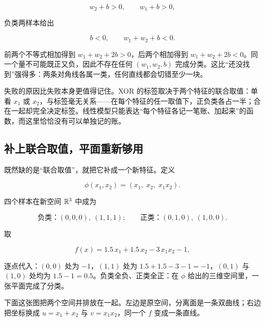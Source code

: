 \[
w_2+b>0,\qquad w_1+b>0,
\]

负类两样本给出

\[
b<0,\qquad w_1+w_2+b<0.
\]

前两个不等式相加得到 \(w_1+w_2+2b>0\)，后两个相加得到 \(w_1+w_2+2b<0\)。同一个量不可能既正又负，因此不存在任何 \((w_1,w_2,b)\) 完成分类。这比``还没找到''强得多：两条对角线各属一类，任何直线都会切错至少一块。

失败的原因比失败本身更值得记住。XOR 的标签取决于两个特征的联合取值：单看 \(x_1\) 或 \(x_2\)，与标签毫无关系——在每个特征的任一取值下，正负类各占一半；合在一起却完全决定标签。线性模型只能表达``每个特征各记一笔账、加起来''的函数，而这里恰恰没有可以单独记的账。

\subsection{补上联合取值，平面重新够用}

既然缺的是``联合取值''，就把它补成一个新特征。定义

\[
\phi(x_1,x_2)=(x_1,\;x_2,\;x_1x_2).
\]

四个样本在新空间 \(\mathbb{R}^3\) 中成为

\[
\text{负类：}(0,0,0),\ (1,1,1);
\qquad
\text{正类：}(0,1,0),\ (1,0,0).
\]

取

\[
f(x)=1.5\,x_1+1.5\,x_2-3\,x_1x_2-1,
\]

逐点代入：\((0,0)\) 处为 \(-1\)，\((1,1)\) 处为 \(1.5+1.5-3-1=-1\)，\((0,1)\) 与 \((1,0)\) 处均为 \(1.5-1=0.5\)。负类全负、正类全正：在 \(\phi\) 给出的三维空间里，一张平面完成了分类。

下面这张图把两个空间并排放在一起。左边是原空间，分离面是一条双曲线；右边把坐标换成 \(u=x_1+x_2\) 与 \(v=x_1x_2\)，同一个 \(f\) 变成一条直线。

